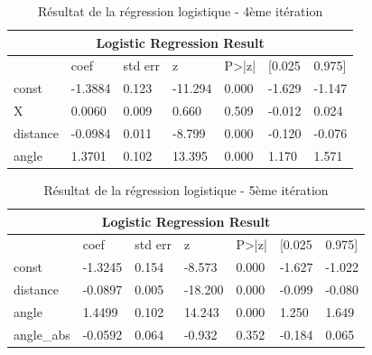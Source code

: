 \documentclass[12pt]{article}
\begin{document}
\begin{table}[htp]
    \centering
    \begin{tabular}{lllllll}
    \multicolumn{7}{c}{\textbf{Logistic Regression Result}}                           \\ \hline
             & coef    & std err & z       & P\textgreater{}|z| & {[}0.025 & 0.975{]} \\ \hline
    const    & -1.3884 & 0.123   & -11.294 & 0.000              & -1.629   & -1.147   \\
    X        & 0.0060  & 0.009   & 0.660   & 0.509              & -0.012   & 0.024    \\
    distance & -0.0984 & 0.011   & -8.799  & 0.000              & -0.120   & -0.076   \\
    angle    & 1.3701  & 0.102   & 13.395  & 0.000              & 1.170    & 1.571    \\ \hline
    \end{tabular}
    \caption{Résultat de la régression logistique - 4ème itération}
    \label{tab:logistic_regression_result_4}
\end{table}

\begin{table}[htp]
    \centering
    \begin{tabular}{lllllll}
    \multicolumn{7}{c}{\textbf{Logistic Regression Result}}                             \\ \hline
               & coef    & std err & z       & P\textgreater{}|z| & {[}0.025 & 0.975{]} \\ \hline
    const      & -1.3245 & 0.154   & -8.573  & 0.000              & -1.627   & -1.022   \\
    distance   & -0.0897 & 0.005   & -18.200 & 0.000              & -0.099   & -0.080   \\
    angle      & 1.4499  & 0.102   & 14.243  & 0.000              & 1.250    & 1.649    \\
    angle\_abs & -0.0592 & 0.064   & -0.932  & 0.352              & -0.184   & 0.065    \\ \hline
    \end{tabular}
    \caption{Résultat de la régression logistique - 5ème itération}
    \label{tab:logistic_regression_result_5}
\end{table}
\end{document}
